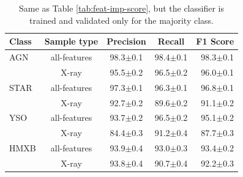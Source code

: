 \documentclass[fleqn,usenatbib]{mnras}
\begin{document}
    \begin{table}
        \centering
        \caption{Same as Table \ref{tab:feat-imp-score}, but the classifier is trained and validated only for the majority class.}
        \label{tab:feat-imp-score-majority-class}
        \begin{tabular}{lcccr}
            \toprule
                 \textbf{Class} & \textbf{Sample type}   & \textbf{Precision} & \textbf{Recall} & \textbf{F1 Score} \\
            \midrule
            AGN & all-features &  98.3$\pm$0.1 &  98.4$\pm$0.1 &  98.3$\pm$0.1 \\
                 & X-ray &  95.5$\pm$0.2 &  96.5$\pm$0.2 &  96.0$\pm$0.1 \\
            STAR & all-features &  97.3$\pm$0.1 &  96.3$\pm$0.1 &  96.8$\pm$0.1 \\
                 & X-ray &  92.7$\pm$0.2 &  89.6$\pm$0.2 &  91.1$\pm$0.2 \\
            YSO & all-features &  93.7$\pm$0.2 &  96.5$\pm$0.2 &  95.1$\pm$0.2 \\
                 & X-ray &  84.4$\pm$0.3 &  91.2$\pm$0.4 &  87.7$\pm$0.3 \\
            HMXB & all-features &  93.9$\pm$0.4 &  93.0$\pm$0.3 &  93.4$\pm$0.2 \\
                 & X-ray &  93.8$\pm$0.4 &  90.7$\pm$0.4 &  92.2$\pm$0.3 \\
            \bottomrule
        \end{tabular}
    \end{table}
\end{document}
